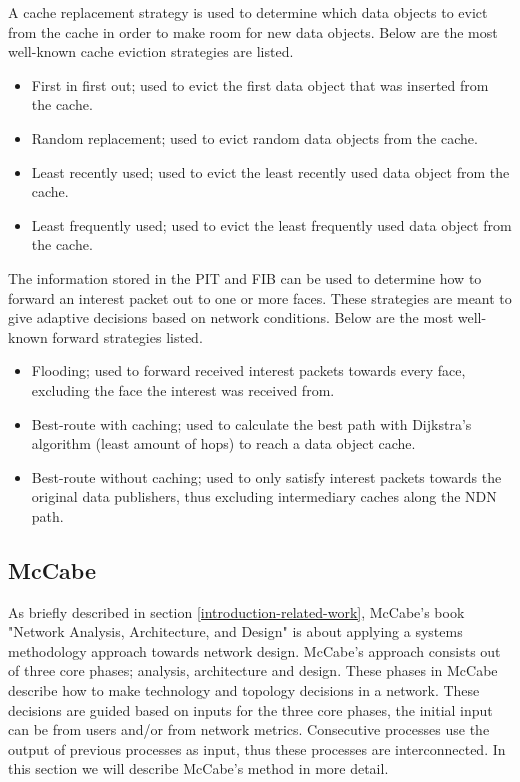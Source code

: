 A cache replacement strategy is used to determine which data objects to evict from the cache in order to make room for new data objects. Below are the most well-known cache eviction strategies are listed.
\begin{itemize}
    \item First in first out; used to evict the first data object that was inserted from the cache.
    \item Random replacement; used to evict random data objects from the cache.
    \item Least recently used; used to evict the least recently used data object from the cache.
    \item Least frequently used; used to evict the least frequently used data object from the cache.
\end{itemize}

The information stored in the PIT and FIB can be used to determine how to forward an interest packet out to one or more faces. These strategies are meant to give adaptive decisions based on network conditions. Below are the most well-known forward strategies listed.
\begin{itemize}
    \item Flooding; used to forward received interest packets towards every face, excluding the face the interest was received from.
    \item Best-route with caching; used to calculate the best path with Dijkstra's algorithm (least amount of hops) to reach a data object cache.
    \item Best-route without caching; used to only satisfy interest packets towards the original data publishers, thus excluding intermediary caches along the NDN path.
\end{itemize}

\subsection{McCabe}
\label{overview-mccabe}
As briefly described in section \ref{introduction-related-work}, McCabe's book "Network Analysis, Architecture, and Design" \cite{mccabe2010network} is about applying a systems methodology approach towards network design. McCabe's approach consists out of three core phases; analysis, architecture and design. These phases in McCabe describe how to make technology and topology decisions in a network. These decisions are guided based on inputs for the three core phases, the initial input can be from users and/or from network metrics. Consecutive processes use the output of previous processes as input, thus these processes are interconnected. In this section we will describe McCabe's method in more detail.

